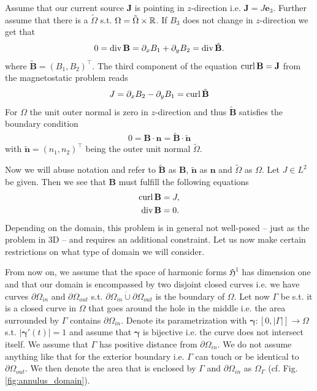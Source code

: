 \documentclass[../master_thesis.tex]{subfiles}
\begin{document}
Assume that our current source 
$\mathbf{J}$ is pointing in $z$-direction i.e. $\mathbf{J} = J \mathbf{e}_3$. 
Further assume that there is a $\tilde{\Omega}$ s.t. 
$\Omega = \tilde{\Omega} \times \mathbb{R}$. If $B_3$ does not change in $z$-direction we get that 
\begin{align*}
    0 = \operatorname{div} \mathbf{B} = \partial_x B_1 + \partial_y B_2 = \operatorname{div} \tilde{\mathbf{B}}.
\end{align*}
where $\tilde{\mathbf{B}} = (B_1,B_2)^\top$. The third component of the equation
$\operatorname{curl} \mathbf{B} = \mathbf{J}$ from the magnetostatic problem reads 
\begin{align*}
    J = \partial_x B_2 - \partial_y B_1 = \operatorname{curl} \tilde{\mathbf{B}}
\end{align*}
For $\Omega$ the unit outer normal is zero in $z$-direction and thus $\tilde{\mathbf{B}}$ 
satisfies the boundary 
condition
\begin{align*}
    0 = \mathbf{B} \cdot \mathbf{n} = \tilde{\mathbf{B}} \cdot \tilde{\mathbf{n}}
\end{align*}
with $\tilde{\mathbf{n}} = (n_1, n_2)^\top$ being the outer unit normal 
$\tilde{\Omega}$. 

Now we will abuse notation and refer to $\tilde{\mathbf{B}}$ as $\mathbf{B}$, 
$\tilde{\mathbf{n}}$ as $\mathbf{n}$ and $\tilde{\Omega}$ as $\Omega$.
Let $J \in L^2$ be given. Then we see that $\mathbf{B}$ must fulfill the 
following equations
\begin{align*}
    \operatorname{curl} \mathbf{B} &= J,
    \\ \operatorname{div} \mathbf{B} &= 0.
\end{align*}
Depending on the domain, this problem is in general not well-posed -- just as the problem in 3D -- 
and requires an additional constraint. Let us now make certain restrictions 
on what type of domain we will consider. 

From now on, we assume that the space of harmonic forms $\mathfrak{H}^1$ has dimension 
one and that our domain is encompassed by two disjoint closed curves
i.e. we have curves $\partial \Omega_{in}$ and $\partial \Omega_{out}$ s.t. 
$\partial \Omega_{in} \dot\cup \partial\Omega_{out}$ is the boundary of $\Omega$. 
Let now $\Gamma$ be s.t. it is a closed curve in $\Omega$ that goes around the 
hole in the middle i.e. the area surrounded by $\Gamma$ contains $\partial \Omega_{in}$.
Denote its parametrization with $\bm{\gamma}:[0,|\Gamma|] \rightarrow \Omega$ s.t. 
$|\bm{\gamma}'(t)| = 1$ and assume that $\bm{\gamma}$ is bijective i.e. the curve does not 
intersect itself. We assume that $\Gamma$ has positive distance from 
$\partial \Omega_{in}$. We do not assume anything like that for the exterior boundary 
i.e. $\Gamma$ can touch or be identical to $\partial \Omega_{out}$. 
We then denote the area that is enclosed by $\Gamma$ and
$\partial\Omega_{in}$ as $\Omega_\Gamma$ (cf. Fig.\,\ref{fig:annulus_domain}). 
\end{document}

